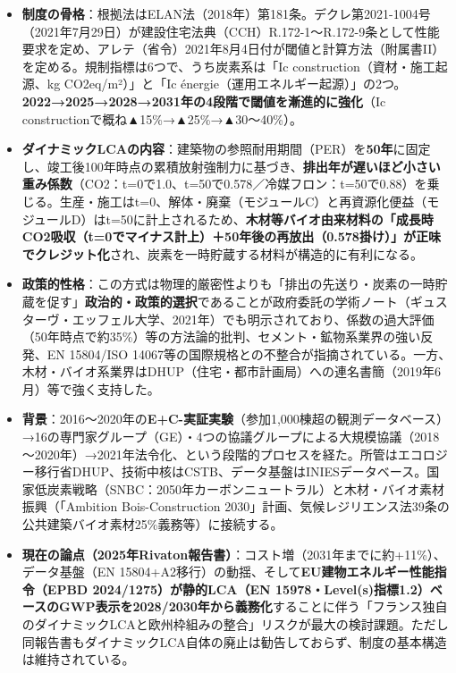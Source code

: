 \documentclass[11pt]{article}
\providecommand{\tightlist}{\setlength{\itemsep}{0pt}\setlength{\parskip}{0pt}}
\begin{document}
\begin{itemize}
\tightlist
\item
  \textbf{制度の骨格}：根拠法はELAN法（2018年）第181条。デクレ第2021-1004号（2021年7月29日）が建設住宅法典（CCH）R.172-1～R.172-9条として性能要求を定め、アレテ（省令）2021年8月4日付が閾値と計算方法（附属書II）を定める。規制指標は6つで、うち炭素系は「Ic
  construction（資材・施工起源、kg CO2eq/m²）」と「Ic
  énergie（運用エネルギー起源）」の2つ。\textbf{2022→2025→2028→2031年の4段階で閾値を漸進的に強化}（Ic
  constructionで概ね▲15\%→▲25\%→▲30～40\%）。
\item
  \textbf{ダイナミックLCAの内容}：建築物の参照耐用期間（PER）を\textbf{50年}に固定し、竣工後100年時点の累積放射強制力に基づき、\textbf{排出年が遅いほど小さい重み係数}（CO2：t=0で1.0、t=50で0.578／冷媒フロン：t=50で0.88）を乗じる。生産・施工はt=0、解体・廃棄（モジュールC）と再資源化便益（モジュールD）はt=50に計上されるため、\textbf{木材等バイオ由来材料の「成長時CO2吸収（t=0でマイナス計上）＋50年後の再放出（0.578掛け）」が正味でクレジット化}され、炭素を一時貯蔵する材料が構造的に有利になる。
\item
  \textbf{政策的性格}：この方式は物理的厳密性よりも「排出の先送り・炭素の一時貯蔵を促す」\textbf{政治的・政策的選択}であることが政府委託の学術ノート（ギュスターヴ・エッフェル大学、2021年）でも明示されており、係数の過大評価（50年時点で約35\%）等の方法論的批判、セメント・鉱物系業界の強い反発、EN
  15804/ISO
  14067等の国際規格との不整合が指摘されている。一方、木材・バイオ系業界はDHUP（住宅・都市計画局）への連名書簡（2019年6月）等で強く支持した。
\item
  \textbf{背景}：2016～2020年の\textbf{E+C-実証実験}（参加1,000棟超の観測データベース）→16の専門家グループ（GE）・4つの協議グループによる大規模協議（2018～2020年）→2021年法令化、という段階的プロセスを経た。所管はエコロジー移行省DHUP、技術中核はCSTB、データ基盤はINIESデータベース。国家低炭素戦略（SNBC：2050年カーボンニュートラル）と木材・バイオ素材振興（「Ambition
  Bois-Construction
  2030」計画、気候レジリエンス法39条の公共建築バイオ素材25\%義務等）に接続する。
\item
  \textbf{現在の論点（2025年Rivaton報告書）}：コスト増（2031年までに約+11\%）、データ基盤（EN
  15804+A2移行）の動揺、そして\textbf{EU建物エネルギー性能指令（EPBD
  2024/1275）が静的LCA（EN
  15978・Level(s)指標1.2）ベースのGWP表示を2028/2030年から義務化}することに伴う「フランス独自のダイナミックLCAと欧州枠組みの整合」リスクが最大の検討課題。ただし同報告書もダイナミックLCA自体の廃止は勧告しておらず、制度の基本構造は維持されている。
\end{itemize}
\end{document}
